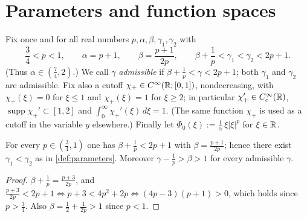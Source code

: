 
\section{Parameters and function spaces}

\begin{definition}
  \label{def:parameters}
  Fix once and for all real numbers $p,\alpha,\beta,\gamma_1,\gamma_2$ with
  \[
    \frac34 < p < 1,\qquad \alpha = p+1,\qquad \beta = \frac{p+1}{2p},\qquad
    \beta+\frac1p < \gamma_1 < \gamma_2 < 2p+1 .
  \]
  (Thus $\alpha\in(\tfrac74,2)$.) We call $\gamma$ \emph{admissible} if
  $\beta+\frac1p<\gamma<2p+1$; both $\gamma_1$ and $\gamma_2$ are admissible.
  Fix also a cutoff $\chi_+\in C^\infty(\mathbb{R};[0,1])$, nondecreasing, with $\chi_+(\xi)=0$ for
  $\xi\le 1$ and $\chi_+(\xi)=1$ for $\xi\ge2$; in particular $\chi_+'\in C^\infty_c(\mathbb{R})$,
  $\operatorname{supp}\chi_+'\subset[1,2]$ and $\int_0^\infty\chi_+'(\xi)\,d\xi=1$.
  (The same function $\chi_+$ is used as a cutoff in the variable $y$ elsewhere.)
  Finally let $\Phi_0(\xi):=\frac1\alpha\,\xi|\xi|^{p}$ for $\xi\in\mathbb{R}$.
\end{definition}

\begin{lemma}
  \label{lem:c02_parameter_range_nonempty}
  For every $p\in(\frac34,1)$ one has $\beta+\frac1p<2p+1$ with $\beta=\frac{p+1}{2p}$;
  hence there exist $\gamma_1<\gamma_2$ as in \cref{def:parameters}. Moreover
  $\gamma-\frac1p>\beta>1$ for every admissible $\gamma$.
\end{lemma}
\begin{proof}
  $\beta+\frac1p=\frac{p+3}{2p}$, and $\frac{p+3}{2p}<2p+1\iff p+3<4p^2+2p\iff
  (4p-3)(p+1)>0$, which holds since $p>\frac34$. Also $\beta=\frac12+\frac1{2p}>1$ since $p<1$.
\end{proof}


